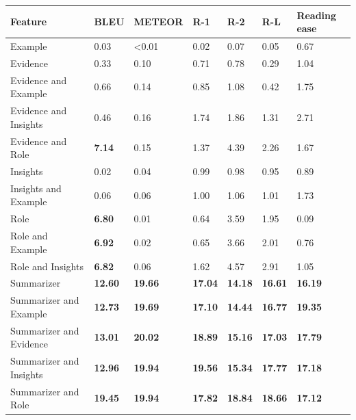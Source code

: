\begin{tabular}{|l|l|l|l|l|l|l|}
\hline
\textbf{Feature} & BLEU & METEOR & R-1 & R-2 & R-L & Reading ease \\
 \hline
 Example & 0.03 & \textless{}0.01 & 0.02 & 0.07 & 0.05 & 0.67 \\
 \hline
 Evidence & 0.33 & 0.10 & 0.71 & 0.78 & 0.29 & 1.04 \\
 \hline
 Evidence and Example & 0.66 & 0.14 & 0.85 & 1.08 & 0.42 & 1.75 \\
 \hline
 Evidence and Insights & 0.46 & 0.16 & 1.74 & 1.86 & 1.31 & 2.71 \\
 \hline
 Evidence and Role & \textbf{7.14} & 0.15 & 1.37 & 4.39 & 2.26 & 1.67 \\
 \hline
 Insights & 0.02 & 0.04 & 0.99 & 0.98 & 0.95 & 0.89 \\
 \hline
 Insights and Example & 0.06 & 0.06 & 1.00 & 1.06 & 1.01 & 1.73 \\
 \hline
 Role & \textbf{6.80} & 0.01 & 0.64 & 3.59 & 1.95 & 0.09 \\
 \hline
 Role and Example & \textbf{6.92} & 0.02 & 0.65 & 3.66 & 2.01 & 0.76 \\
 \hline
 Role and Insights & \textbf{6.82} & 0.06 & 1.62 & 4.57 & 2.91 & 1.05 \\
 \hline
 Summarizer & \textbf{12.60} & \textbf{19.66} & \textbf{17.04} & \textbf{14.18} & \textbf{16.61} & \textbf{16.19} \\
 \hline
 Summarizer and Example & \textbf{12.73} & \textbf{19.69} & \textbf{17.10} & \textbf{14.44} & \textbf{16.77} & \textbf{19.35} \\
 \hline
 Summarizer and Evidence & \textbf{13.01} & \textbf{20.02} & \textbf{18.89} & \textbf{15.16} & \textbf{17.03} & \textbf{17.79} \\
 \hline
 Summarizer and Insights & \textbf{12.96} & \textbf{19.94} & \textbf{19.56} & \textbf{15.34} & \textbf{17.77} & \textbf{17.18} \\
 \hline
 Summarizer and Role & \textbf{19.45} & \textbf{19.94} & \textbf{17.82} & \textbf{18.84} & \textbf{18.66} & \textbf{17.12} \\
\hline
\end{tabular}

